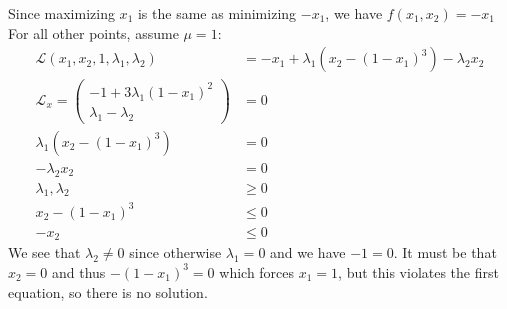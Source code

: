 \documentclass[12pt]{article}
\begin{document}
\begin{problem}[3]
Since maximizing $ x_1$ is the same as minimizing $ -x_1$, we have $ f(x_1,x_2) = -x_1$  For all other points, assume $ \mu=1$:
\begin{align*}
	\mathscr{L}(x_1,x_2,1,\lambda_1,\lambda_2) &= -x_1 + \lambda_1(x_2-(1-x_1)^3)-\lambda_2 x_2\\
	\mathscr{L}_x = \begin{pmatrix} -1+3\lambda_1(1-x_1)^2\\ \lambda_1-\lambda_2 \end{pmatrix} &=0 \\
	\lambda_1(x_2-(1-x_1)^3) &= 0 \\
	-\lambda_2 x_2 &= 0 \\
	\lambda_1,\lambda_2 &\geq 0\\
	x_2-(1-x_1)^3 &\leq 0\\
	-x_2 &\leq 0 
\end{align*}
We see that $ \lambda_2 \neq 0$ since otherwise $ \lambda_1 =0$ and we have $ -1 =0$. It must be that  $ x_2 = 0$ and thus $ -(1-x_1)^3=0$ which forces $ x_1 = 1$, but this violates the first equation, so there is no solution.


\end{problem}
\end{document}
